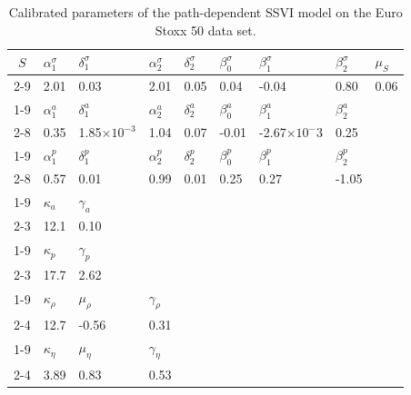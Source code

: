     
\begin{table}[htbp]
    \centering
    \caption{Calibrated parameters of the path-dependent SSVI model on the Euro Stoxx 50 data set. }
    \label{tab:sx5e_params}
    \begin{tabular}{@{}lllllllll@{}}
    \toprule
    \multicolumn{1}{c}{\multirow{2}{*}{$S$}} & $\alpha_1^{\sigma}$ & $\delta_1^{\sigma}$ & $\alpha_2^{\sigma}$ & $\delta_2^{\sigma}$ & $\beta_0^{\sigma}$ & $\beta_1^{\sigma}$ &  $\beta_2^{\sigma}$& $\mu_S$ \\ \cmidrule(l){2-9} 
    \multicolumn{1}{c}{}                   &2.01  & 0.03 & 2.01 & 0.05 & 0.04 & -0.04 & 0.80 & 0.06 \\ \cmidrule(r){1-9}
    \multicolumn{1}{c}{\multirow{2}{*}{$a$}} & $\alpha_1^{a}$ & $\delta_1^{a}$ & $\alpha_2^{a}$ & $\delta_2^{a}$ & $\beta_0^{a}$ & $\beta_1^{a}$ &  $\beta_2^{a}$ \\ \cmidrule(l){2-8} 
    \multicolumn{1}{c}{}                   &0.35  & 1.85$\times 10^{-3}$ & 1.04 & 0.07 & -0.01 & -2.67$\times 10^-3$ & 0.25 \\ \cmidrule(r){1-9}
    \multicolumn{1}{c}{\multirow{2}{*}{$p$}} & $\alpha_1^{p}$ & $\delta_1^{p}$ & $\alpha_2^{p}$ & $\delta_2^{p}$ & $\beta_0^{p}$ & $\beta_1^{p}$ &  $\beta_2^{p}$ \\ \cmidrule(l){2-8} 
    \multicolumn{1}{c}{}                   &0.57  & 0.01 & 0.99 & 0.01 & 0.25 & 0.27 & -1.05 \\ \cmidrule(r){1-9}
    \multicolumn{1}{c}{\multirow{2}{*}{$\varepsilon^a$}} & $\kappa_a$ & $\gamma_a$  \\ \cmidrule(l){2-3} 
    \multicolumn{1}{c}{}                   &12.1 & 0.10  \\ \cmidrule(r){1-9} 
    \multicolumn{1}{c}{\multirow{2}{*}{$\varepsilon^p$}} & $\kappa_p$ & $\gamma_p$  \\ \cmidrule(l){2-3} 
    \multicolumn{1}{c}{}                   &17.7  & 2.62  \\ \cmidrule(r){1-9} 
    \multicolumn{1}{c}{\multirow{2}{*}{$\rho$}} & $\kappa_{\rho}$ & $\mu_{\rho}$ & $\gamma_{\rho}$  \\ \cmidrule(l){2-4} 
    \multicolumn{1}{c}{}                   &12.7  & -0.56 & 0.31  \\ \cmidrule(r){1-9} 
    \multicolumn{1}{c}{\multirow{2}{*}{$\eta$}} & $\kappa_{\eta}$ & $\mu_{\eta}$ & $\gamma_{\eta}$  \\ \cmidrule(l){2-4} 
    \multicolumn{1}{c}{}                   &3.89  & 0.83 & 0.53  \\ 
    \bottomrule
    \end{tabular}
    \end{table}


